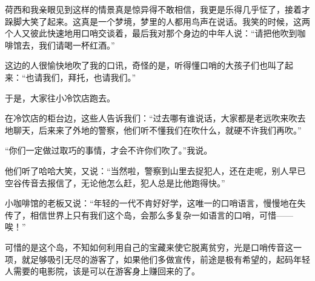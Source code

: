 \par 荷西和我亲眼见到这样的情景真是惊异得不敢相信，我更是乐得几乎怔了，接着才跺脚大笑了起来。这真是一个梦境，梦里的人都用鸟声在说话。我笑的时候，这两个人又彼此快速地用口哨交谈着，最后我对那个身边的中年人说：“请把他吹到咖啡馆去，我们请喝一杯红酒。”
\par 这边的人很愉快地吹了我的口讯，奇怪的是，听得懂口哨的大孩子们也叫了起来：“也请我们，拜托，也请我们。”
\par 于是，大家往小冷饮店跑去。
\par 在冷饮店的柜台边，这些人告诉我们：“过去哪有谁说话，大家都是老远吹来吹去地聊天，后来来了外地的警察，他们听不懂我们在吹什么，就硬不许我们再吹。”
\par “你们一定做过取巧的事情，才会不许你们吹了。”我说。
\par 他们听了哈哈大笑，又说：“当然啦，警察到山里去捉犯人，还在走呢，别人早已空谷传音去报信了，无论他怎么赶，犯人总是比他跑得快。”
\par 小咖啡馆的老板又说：“年轻的一代不肯好好学，这唯一的口哨语言，慢慢地在失传了，相信世界上只有我们这个岛，会那么多复杂一如语言的口哨，可惜——唉！”
\par 可惜的是这个岛，不知如何利用自己的宝藏来使它脱离贫穷，光是口哨传音这一项，就足够吸引无尽的游客了，如果他们多做宣传，前途是极有希望的，起码年轻人需要的电影院，该是可以在游客身上赚回来的了。
